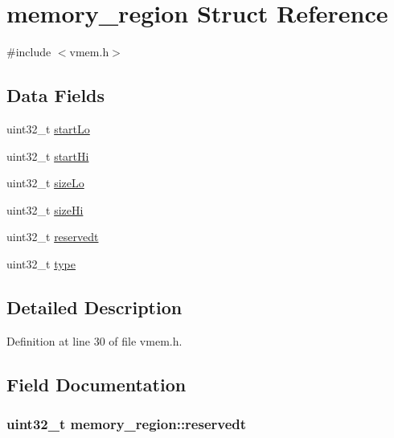 \hypertarget{structmemory__region}{}\section{memory\+\_\+region Struct Reference}
\label{structmemory__region}


{\ttfamily \#include $<$vmem.\+h$>$}

\subsection*{Data Fields}
\begin{DoxyCompactItemize}
\item 
uint32\+\_\+t \hyperlink{structmemory__region_a85b8ec619e9aa2053ea033c5b7d3683c}{start\+Lo}
\item 
uint32\+\_\+t \hyperlink{structmemory__region_a090957a0a7f28700a605cf6f5e8f614a}{start\+Hi}
\item 
uint32\+\_\+t \hyperlink{structmemory__region_a4a94d273dbfc6c96ab6a5a26ba2e9673}{size\+Lo}
\item 
uint32\+\_\+t \hyperlink{structmemory__region_a3d6aa91c428379cfc829556e48aee067}{size\+Hi}
\item 
uint32\+\_\+t \hyperlink{structmemory__region_a0a703f9622df6e208c1c65465f476bd6}{reservedt}
\item 
uint32\+\_\+t \hyperlink{structmemory__region_a3591afc4df88a58fa5a91eab6ebe94cc}{type}
\end{DoxyCompactItemize}


\subsection{Detailed Description}


Definition at line 30 of file vmem.\+h.



\subsection{Field Documentation}
\subsubsection[{\texorpdfstring{reservedt}{reservedt}}]{\setlength{\rightskip}{0pt plus 5cm}uint32\+\_\+t memory\+\_\+region\+::reservedt}\hypertarget{structmemory__region_a0a703f9622df6e208c1c65465f476bd6}{}\label{structmemory__region_a0a703f9622df6e208c1c65465f476bd6}


